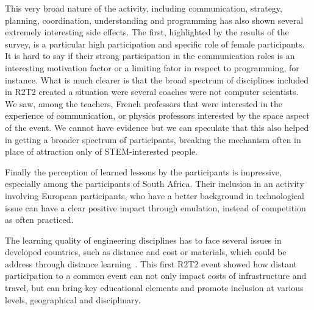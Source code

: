 \documentclass{intech-journal}
\begin{document}

This very broad nature of the activity, including communication, strategy, planning, coordination, understanding and programming has also shown several extremely interesting side effects.
The first, highlighted by the results of the survey, is a particular high participation and specific role of female participants.
It is hard to say if their strong participation in the communication roles is an interesting motivation factor or a limiting fator in respect to programming, for instance. 
What is much clearer is that the broad spectrum of disciplines included in R2T2 created a situation were several coaches were not computer scientists. 
We saw, among the teachers, French professors that were interested in the experience of communication, or physics professors interested by the space aspect of the event. 
We cannot have evidence but we can speculate that this also helped in getting a broader spectrum of participants, breaking the mechanism often in place of attraction only of STEM-interested people.

Finally the perception of learned lessons by the participants is impressive, especially among the participants of South Africa.
Their inclusion in an activity involving European participants, who have a better background in technological issue can have a clear positive impact through emulation, instead of competition as often practiced. 

The learning quality of engineering disciplines has to face several issues in developed countries, such as distance and cost or materials, which could be address through distance learning~\cite{winthrop2012new}. 
This first R2T2 event showed how distant participation to a common event can not only impact costs of infrastructure and travel, but can bring key educational elements and promote inclusion at various levels, geographical and disciplinary.

{}
\end{document}
